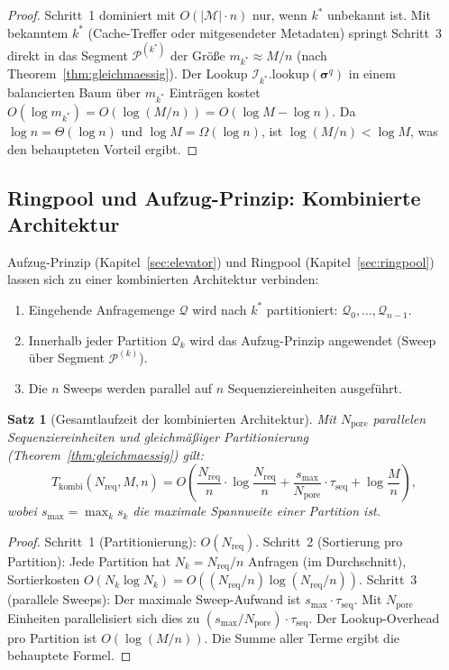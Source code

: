 ﻿\documentclass[a4paper,12pt]{article}
\theoremstyle{definition}
\theoremstyle{plain}
\newtheorem{satz}{Satz}[section]
\begin{document}
\begin{proof}
  Schritt~1 dominiert mit $O(|\mathcal{M}| \cdot n)$ nur, wenn $k^*$
  unbekannt ist.  Mit bekanntem $k^*$ (Cache-Treffer oder mitgesendeter
  Metadaten) springt Schritt~3 direkt in das Segment $\mathcal{P}^{(k^*)}$
  der Größe $m_{k^*} \approx M/n$ (nach Theorem~\ref{thm:gleichmaessig}).
  Der Lookup $\mathcal{I}_{k^*}.\mathrm{lookup}(\boldsymbol{\sigma}^q)$
  in einem balancierten Baum über $m_{k^*}$ Einträgen kostet
  $O(\log m_{k^*}) = O(\log(M/n)) = O(\log M - \log n)$.
  Da $\log n = \Theta(\log n)$ und $\log M = \Omega(\log n)$, ist
  $\log(M/n) < \log M$, was den behaupteten Vorteil ergibt. 
\end{proof}

\subsection{Ringpool und Aufzug-Prinzip: Kombinierte Architektur}
\label{ssec:ring_elevator}

Aufzug-Prinzip (Kapitel~\ref{sec:elevator}) und Ringpool
(Kapitel~\ref{sec:ringpool}) lassen sich zu einer kombinierten
Architektur verbinden:

\begin{enumerate}
  \item Eingehende Anfragemenge $\mathcal{Q}$ wird nach $k^*$ partitioniert:
        $\mathcal{Q}_0, \ldots, \mathcal{Q}_{n-1}$.
  \item Innerhalb jeder Partition $\mathcal{Q}_k$ wird das Aufzug-Prinzip
        angewendet (Sweep über Segment $\mathcal{P}^{(k)}$).
  \item Die $n$ Sweeps werden parallel auf $n$ Sequenziereinheiten
        ausgeführt.
\end{enumerate}

\begin{satz}[Gesamtlaufzeit der kombinierten Architektur]
\label{satz:ring_elevator}
  Mit $N_{\mathrm{pore}}$ parallelen Sequenziereinheiten und
  gleichmäßiger Partitionierung (Theorem~\ref{thm:gleichmaessig}) gilt:
  \[
    T_{\mathrm{kombi}}(N_{\mathrm{req}}, M, n)
    = O\!\left(\frac{N_{\mathrm{req}}}{n} \cdot \log \frac{N_{\mathrm{req}}}{n}
      + \frac{s_{\max}}{N_{\mathrm{pore}}} \cdot \tau_{\mathrm{seq}}
      + \log \frac{M}{n}\right),
  \]
  wobei $s_{\max} = \max_k s_k$ die maximale Spannweite einer Partition ist.
\end{satz}

\begin{proof}
  Schritt~1 (Partitionierung): $O(N_{\mathrm{req}})$.
  Schritt~2 (Sortierung pro Partition): Jede Partition hat
  $N_k = N_{\mathrm{req}}/n$ Anfragen (im Durchschnitt),
  Sortierkosten $O(N_k \log N_k) = O((N_{\mathrm{req}}/n)\log(N_{\mathrm{req}}/n))$.
  Schritt~3 (parallele Sweeps): Der maximale Sweep-Aufwand ist
  $s_{\max} \cdot \tau_{\mathrm{seq}}$.  Mit $N_{\mathrm{pore}}$ Einheiten
  parallelisiert sich dies zu $(s_{\max}/N_{\mathrm{pore}}) \cdot \tau_{\mathrm{seq}}$.
  Der Lookup-Overhead pro Partition ist $O(\log(M/n))$.
  Die Summe aller Terme ergibt die behauptete Formel. 
\end{proof}
\end{document}
